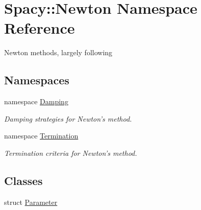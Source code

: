 \hypertarget{namespaceSpacy_1_1Newton}{\section{\-Spacy\-:\-:\-Newton \-Namespace \-Reference}
\label{namespaceSpacy_1_1Newton}
}


\-Newton methods, largely following  


\subsection*{\-Namespaces}
\begin{DoxyCompactItemize}
\item 
namespace \hyperlink{namespaceSpacy_1_1Newton_1_1Damping}{\-Damping}
\begin{DoxyCompactList}\small\item\em \-Damping strategies for \-Newton's method. \end{DoxyCompactList}\item 
namespace \hyperlink{namespaceSpacy_1_1Newton_1_1Termination}{\-Termination}
\begin{DoxyCompactList}\small\item\em \-Termination criteria for \-Newton's method. \end{DoxyCompactList}\end{DoxyCompactItemize}
\subsection*{\-Classes}
\begin{DoxyCompactItemize}
\item 
struct \hyperlink{structSpacy_1_1Newton_1_1Parameter}{\-Parameter}
\end{DoxyCompactItemize}
